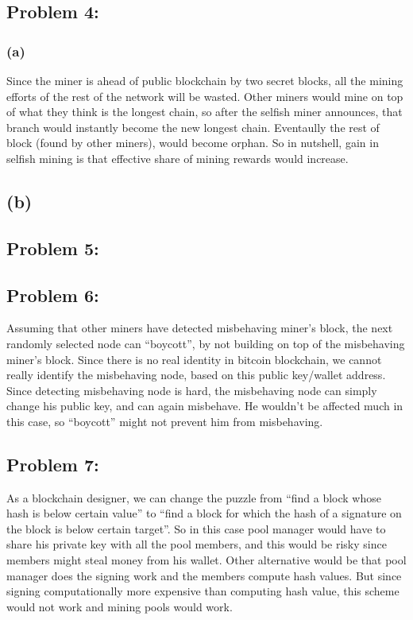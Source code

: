 \documentclass[a4paper]{article}
\begin{document}
\subsection*{Problem 4:}
\subsubsection*{(a)}
Since the miner is ahead of public blockchain by two secret blocks, all the mining efforts of the rest of the network
will be wasted. Other miners would mine on top of what they think is the longest chain, so after the
selfish miner announces, that branch would instantly become the new longest chain. Eventaully 
the rest of block (found by other miners), would become orphan. So in nutshell, gain in selfish mining
is that effective share of mining rewards would increase. \\

\subsection*{(b)}


\subsection*{Problem 5:}


\subsection*{Problem 6:}
Assuming that other miners have detected misbehaving miner's block, the next randomly selected node can
``boycott'', by not building on top of the misbehaving miner's block. Since there is no real identity in
bitcoin blockchain, we cannot really identify the misbehaving node, based on this public key/wallet address.
Since detecting misbehaving node is hard, the misbehaving node can simply change his public key, and
can again misbehave. He wouldn't be affected much in this case, so ``boycott'' might not prevent him from misbehaving.

\subsection*{Problem 7:}
As a blockchain designer, we can change the puzzle from ``find a block whose hash is below certain value'' to
``find a block for which the hash of a signature on the block is below certain target''. So in this case
pool manager would have to share his private key with all the pool members, and this would be risky
since members might steal money from his wallet. Other alternative would be that pool manager does the signing work
and the members compute hash values. But since signing computationally more expensive than computing hash value,
this scheme would not work and mining pools would work.
\end{document}

